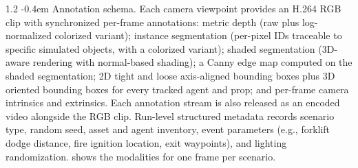 \documentclass{llmxive}
\makeatletter
\providecommand{\paragraph}{  \@startsection{paragraph}{4}{\z@}    {1\baselineskip \@plus .2\baselineskip}    {-0.4em}    {\normalfont\normalsize\bfseries}}
\makeatother
\begin{document}
\paragraph{Annotation schema.}
Each camera viewpoint provides an H.264 RGB clip with synchronized per-frame annotations: metric depth (raw plus log-normalized colorized variant); instance segmentation (per-pixel IDs traceable to specific simulated objects, with a colorized variant); shaded segmentation (3D-aware rendering with normal-based shading); a Canny edge map computed on the shaded segmentation; 2D tight and loose axis-aligned bounding boxes plus 3D oriented bounding boxes for every tracked agent and prop; and per-frame camera intrinsics and extrinsics. Each annotation stream is also released as an encoded video alongside the RGB clip. Run-level structured metadata records scenario type, random seed, asset and agent inventory, event parameters (e.g., forklift dodge distance, fire ignition location, exit waypoints), and lighting randomization.  shows the modalities for one frame per scenario.
\end{document}
